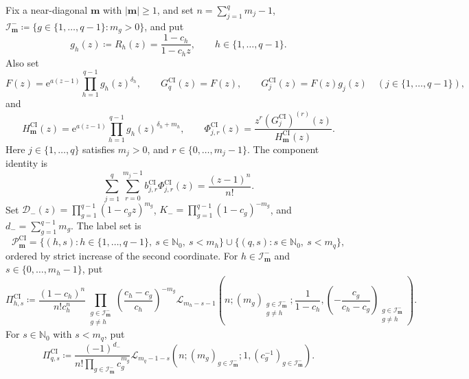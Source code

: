\documentclass[10pt]{amsart}
\newcommand{\Nzero}{\mathbb N_0}
\newcommand{\abs}[1]{\lvert#1\rvert}
\theoremstyle{plain}
\theoremstyle{definition}
\theoremstyle{remark}
\begin{document}
Fix a near-diagonal \(\boldsymbol m\) with
\(\abs{\boldsymbol m}\ge1\), and set
\(n=\sum_{j=1}^q m_j-1\),
\(\mathcal I_{\boldsymbol m}^-\coloneq
\{g\in\{1,\ldots,q-1\}:m_g>0\}\), and put
\[
 g_h(z)\coloneq R_h(z)=\frac{1-c_h}{1-c_hz},
 \qquad h\in\{1,\ldots,q-1\}.
\]
Also set
\[
 F(z)=\mathrm e^{a(z-1)}
 \prod_{h=1}^{q-1}g_h(z)^{\delta_h},\qquad
 G_q^{\mathrm{CI}}(z)=F(z),\qquad
 G_j^{\mathrm{CI}}(z)=F(z)g_j(z)\quad
 (j\in\{1,\ldots,q-1\}),
\]
and
\[
 H_{\boldsymbol m}^{\mathrm{CI}}(z)
 =\mathrm e^{a(z-1)}
 \prod_{h=1}^{q-1}g_h(z)^{\delta_h+m_h},\qquad
 \Phi_{j,r}^{\mathrm{CI}}(z)
 =\frac{z^r(G_j^{\mathrm{CI}})^{(r)}(z)}
 {H_{\boldsymbol m}^{\mathrm{CI}}(z)}.
\]
Here \(j\in\{1,\ldots,q\}\) satisfies \(m_j>0\), and
\(r\in\{0,\ldots,m_j-1\}\).
The component identity is
\begin{equation}
 \sum_{j=1}^q\sum_{r=0}^{m_j-1}
 b_{j,r}^{\mathrm{CI}}\Phi_{j,r}^{\mathrm{CI}}(z)
 =\frac{(z-1)^n}{n!}.
 \label{eq:typeI-CI-component-identity}
\end{equation}
Set \(\mathcal D_-(z)=\prod_{g=1}^{q-1}(1-c_gz)^{m_g}\),
\(K_-=\prod_{g=1}^{q-1}(1-c_g)^{-m_g}\), and
\(d_-=\sum_{g=1}^{q-1}m_g\).
The label set is
\[
 \mathscr P_{\boldsymbol m}^{\mathrm{CI}}
 =\{(h,s):h\in\{1,\ldots,q-1\},\ s\in\Nzero,\ s<m_h\}
 \cup\{(q,s):s\in\Nzero,\ s<m_q\},
\]
ordered by strict increase of the second coordinate. For
\(h\in\mathcal I_{\boldsymbol m}^-\) and
\(s\in\{0,\ldots,m_h-1\}\), put
\begin{equation}
 \Pi_{h,s}^{\mathrm{CI}}
 \coloneq
 \frac{(1-c_h)^n}{n!c_h^n}
 \prod_{\substack{g\in\mathcal I_{\boldsymbol m}^-\\g\ne h}}
 \left(\frac{c_h-c_g}{c_h}\right)^{-m_g}
 \mathscr L_{m_h-s-1}
 \left(
 n;(m_g)_{\substack{g\in\mathcal I_{\boldsymbol m}^-\\g\ne h}};
 \frac1{1-c_h},
 \left(-\frac{c_g}{c_h-c_g}\right)_{
       \substack{g\in\mathcal I_{\boldsymbol m}^-\\g\ne h}}
 \right).
 \label{eq:typeI-CI-Pi-finite}
\end{equation}
For \(s\in\Nzero\) with \(s<m_q\), put
\begin{equation}
 \Pi_{q,s}^{\mathrm{CI}}
 \coloneq
 \frac{(-1)^{d_-}}
 {n!\displaystyle\prod_{g\in\mathcal I_{\boldsymbol m}^-}c_g^{m_g}}
 \mathscr L_{m_q-1-s}
 \left(
 n;(m_g)_{g\in\mathcal I_{\boldsymbol m}^-};
 1,(c_g^{-1})_{g\in\mathcal I_{\boldsymbol m}^-}
 \right).
 \label{eq:typeI-CI-Pi-infinity}
\end{equation}
\end{document}
